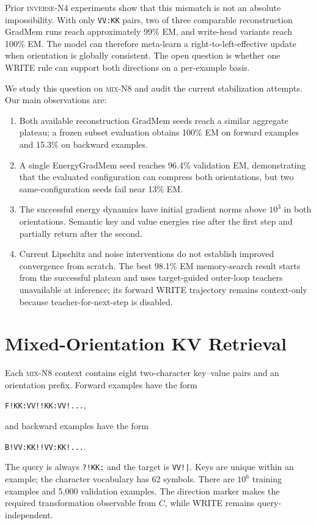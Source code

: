 \documentclass{article}
\newcommand{\dataset}{\textsc{mix-N8}}
\newcommand{\inverse}{\textsc{inverse-N4}}
\newcommand{\egm}{EnergyGradMem}
\newcommand{\gm}{GradMem}
\begin{document}
Prior \inverse{} experiments show that this mismatch is not an absolute impossibility.  With only \texttt{VV:KK} pairs, two of three comparable reconstruction \gm{} runs reach approximately 99\% EM, and write-head variants reach 100\% EM.  The model can therefore meta-learn a right-to-left-effective update when orientation is globally consistent.  The open question is whether one WRITE rule can support both directions on a per-example basis.

We study this question on \dataset{} and audit the current stabilization attempts.  Our main observations are:
\begin{enumerate}
  \item Both available reconstruction \gm{} seeds reach a similar aggregate plateau; a frozen subset evaluation obtains 100\% EM on forward examples and 15.3\% on backward examples.
  \item A single \egm{} seed reaches 96.4\% validation EM, demonstrating that the evaluated configuration can compress both orientations, but two same-configuration seeds fail near 13\% EM.
  \item The successful energy dynamics have initial gradient norms above $10^3$ in both orientations.  Semantic key and value energies rise after the first step and partially return after the second.
  \item Current Lipschitz and noise interventions do not establish improved convergence from scratch.  The best 98.1\% EM memory-search result starts from the successful plateau and uses target-guided outer-loop teachers unavailable at inference; its forward WRITE trajectory remains context-only because teacher-for-next-step is disabled.
\end{enumerate}

\section{Mixed-Orientation KV Retrieval}
\label{sec:task}

Each \dataset{} context contains eight two-character key--value pairs and an orientation prefix.  Forward examples have the form
\begin{center}
\texttt{F!KK:VV!!KK:VV!...},
\end{center}
and backward examples have the form
\begin{center}
\texttt{B!VV:KK!!VV:KK!...}.
\end{center}
The query is always \texttt{?!KK:} and the target is \texttt{VV!|}.  Keys are unique within an example; the character vocabulary has 62 symbols.  There are $10^6$ training examples and 5,000 validation examples.  The direction marker makes the required transformation observable from $C$, while WRITE remains query-independent.
\end{document}
